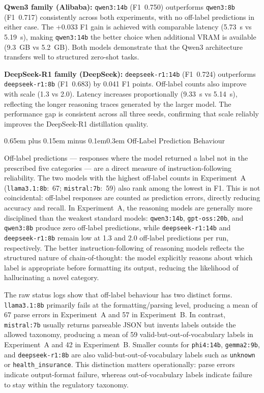 \documentclass[10pt,a4paper,twocolumn]{article}
\makeatletter
\renewcommand\subsection{\@startsection{subsection}{2}{0pt}%
  {0.65em plus 0.15em minus 0.1em}{0.3em}%
  {\normalfont\normalsize\itshape}}
\makeatother
\begin{document}
\textbf{Qwen3 family (Alibaba):} \texttt{qwen3:14b} (F1~0.750)
outperforms \texttt{qwen3:8b} (F1~0.717) consistently across both
experiments, with no off-label predictions in either case. The
+0.033 F1 gain is achieved with comparable latency (5.73~s vs 5.19~s),
making \texttt{qwen3:14b} the better choice when additional VRAM is
available (9.3~GB vs 5.2~GB). Both models demonstrate that the Qwen3
architecture transfers well to structured zero-shot tasks.

\textbf{DeepSeek-R1 family (DeepSeek):} \texttt{deepseek-r1:14b}
(F1~0.724) outperforms \texttt{deepseek-r1:8b} (F1~0.683) by 0.041
F1 points. Off-label counts also improve with scale (1.3 vs 2.0).
Latency increases proportionally (9.33~s vs 5.14~s), reflecting
the longer reasoning traces generated by the larger model. The
performance gap is consistent across all three seeds, confirming
that scale reliably improves the DeepSeek-R1 distillation quality.

\subsection{Off-Label Prediction Behaviour}

Off-label predictions --- responses where the model returned a label
not in the prescribed five categories --- are a direct measure of
instruction-following reliability. The two models with the highest
off-label counts in Experiment~A
(\texttt{llama3.1:8b}:~67; \texttt{mistral:7b}:~59)
also rank among the lowest in F1. This is
not coincidental: off-label responses are counted as prediction
errors, directly reducing accuracy and recall. In Experiment~A, the
reasoning models are generally more disciplined than the weakest
standard models: \texttt{qwen3:14b}, \texttt{gpt-oss:20b}, and
\texttt{qwen3:8b} produce zero off-label predictions, while
\texttt{deepseek-r1:14b} and \texttt{deepseek-r1:8b} remain low at
1.3 and 2.0 off-label predictions per run, respectively.
The better instruction-following of reasoning models reflects the
structured nature of chain-of-thought: the model explicitly reasons
about which label is appropriate before formatting its output,
reducing the likelihood of hallucinating a novel category.

The raw status logs show that off-label behaviour has two distinct
forms. \texttt{llama3.1:8b} primarily fails at the formatting/parsing
level, producing a mean of 67 parse errors in Experiment~A and 57 in
Experiment~B. In contrast, \texttt{mistral:7b} usually returns
parseable JSON but invents labels outside the allowed taxonomy,
producing a mean of 59 valid-but-out-of-vocabulary labels in
Experiment~A and 42 in Experiment~B. Smaller counts for \texttt{phi4:14b},
\texttt{gemma2:9b}, and \texttt{deepseek-r1:8b} are also
valid-but-out-of-vocabulary labels such as \texttt{unknown} or
\texttt{health\_insurance}. This distinction matters operationally:
parse errors indicate output-format failure, whereas out-of-vocabulary
labels indicate failure to stay within the regulatory taxonomy.
\end{document}
